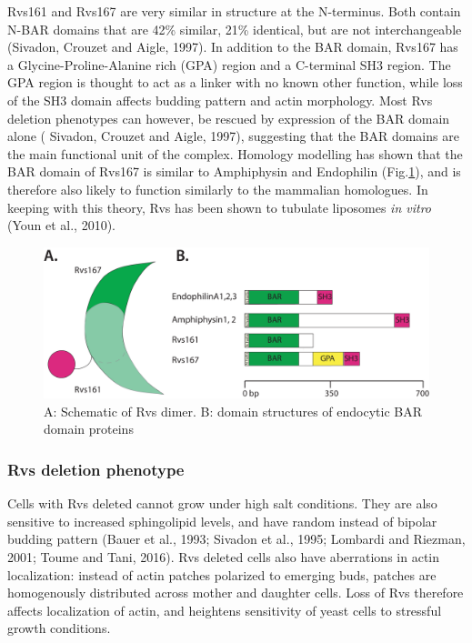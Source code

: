 	\vspace{5mm}
Rvs161 and Rvs167 are very similar in structure at the N-terminus. Both contain N-BAR domains that are 42\% similar, 21\% identical, but are not interchangeable (Sivadon, Crouzet and Aigle, 1997). In addition to the BAR domain, Rvs167 has a Glycine-Proline-Alanine rich (GPA) region and a C-terminal SH3 region. The GPA region is thought to act as a linker with no known other function, while loss of the SH3 domain affects budding pattern and actin morphology. Most Rvs deletion phenotypes can however, be rescued by expression of the BAR domain alone ( Sivadon, Crouzet and Aigle, 1997), suggesting that the BAR domains are the main functional unit of the complex. Homology modelling has shown that the BAR domain of Rvs167 is similar to Amphiphysin and Endophilin (Fig.\ref{rvs_structure}), and is therefore also likely to function similarly to the mammalian homologues. In keeping with this theory, Rvs has been shown to tubulate liposomes \textit{in vitro} (Youn et al., 2010). 


\vspace{5mm}
\begin{figure}[H]
	\centering
	\includegraphics[scale=0.38]{figures/intro/Rvs_stucture2}
	\caption[Homolgy model of Rvs and BAR protein domains]
	{A: Schematic of Rvs dimer.	B: domain structures of endocytic BAR domain proteins
		\label{rvs_structure}}
\end{figure}


	\vspace{5mm}
\subsubsection{Rvs deletion phenotype}
Cells with Rvs deleted cannot grow under high salt conditions. They are also sensitive to increased sphingolipid levels, and have random instead of bipolar budding pattern (Bauer et al., 1993; Sivadon et al., 1995; Lombardi and Riezman, 2001; Toume and Tani, 2016). Rvs deleted cells also have aberrations in actin localization: instead of actin patches polarized to emerging buds, patches are homogenously distributed across mother and daughter cells. Loss of Rvs therefore affects localization of actin, and heightens sensitivity of yeast cells to stressful growth conditions.
 	
